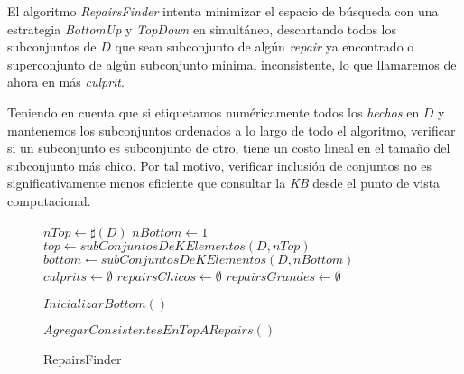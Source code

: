 \documentclass[11pt,a4paper,twoside]{tesis}
\begin{document}
El algoritmo \textit{RepairsFinder} intenta minimizar el espacio de búsqueda con una estrategia \textit{BottomUp} y \textit{TopDown} en simultáneo, descartando todos los subconjuntos de $D$ que sean subconjunto de algún \textit{repair} ya encontrado o superconjunto de algún subconjunto minimal inconsistente, lo que llamaremos de ahora en más \textit{culprit}. 

Teniendo en cuenta que si etiquetamos numéricamente todos los \textit{hechos} en $D$ y mantenemos los subconjuntos ordenados a lo largo de todo el algoritmo, verificar si un subconjunto es subconjunto de otro, tiene un costo lineal en el tamaño del subconjunto más chico. Por tal motivo, verificar inclusión de conjuntos no es significativamente menos eficiente que consultar la \textit{KB} desde el punto de vista computacional. 

\begin{figure}
\begin{algorithm}[H]
\SetAlgoLined
$nTop \gets \sharp(D)$\;
$nBottom \gets 1$\;
$top \gets subConjuntosDeKElementos(D, nTop)$\;
$bottom \gets subConjuntosDeKElementos(D, nBottom)$\;
$culprits \gets \emptyset$\;
$repairsChicos \gets \emptyset$\;
$repairsGrandes \gets \emptyset$\;

$InicializarBottom()$\;


{
$AgregarConsistentesEnTopARepairs()$\;
}
 \caption{RepairsFinder}
\end{algorithm}
\end{figure}
\end{document}
